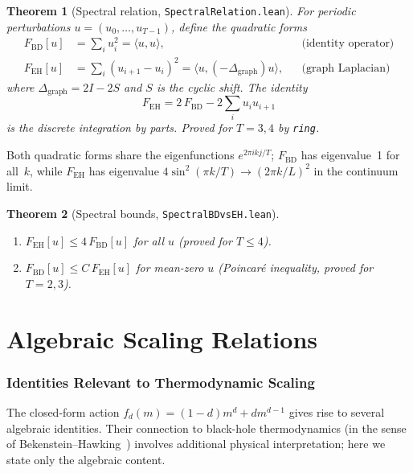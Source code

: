\documentclass[11pt,a4paper]{article}
\newtheorem{theorem}{Theorem}[section]
\theoremstyle{remark}
\begin{document}
\begin{theorem}[Spectral relation, \texttt{SpectralRelation.lean}]
\label{thm:spectral}
For periodic perturbations $u = (u_0, \ldots, u_{T-1})$, define the quadratic forms
\begin{align}
  F_{\mathrm{BD}}[u] &= \sum_i u_i^2 = \langle u, u \rangle,
  &&\text{(identity operator)} \\
  F_{\mathrm{EH}}[u] &= \sum_i (u_{i+1} - u_i)^2 = \langle u, ({-}\Delta_{\mathrm{graph}}) u \rangle,
  &&\text{(graph Laplacian)}
\end{align}
where $\Delta_{\mathrm{graph}} = 2I - 2S$ and $S$ is the cyclic shift.
The identity
\begin{equation}\label{eq:ibp}
  F_{\mathrm{EH}} = 2\,F_{\mathrm{BD}} - 2\sum_i u_i u_{i+1}
\end{equation}
is the discrete integration by parts. Proved for $T = 3, 4$ by \texttt{ring}.
\end{theorem}

Both quadratic forms share the eigenfunctions $e^{2\pi i k j / T}$;
$F_{\mathrm{BD}}$ has eigenvalue~1 for all~$k$, while $F_{\mathrm{EH}}$ has
eigenvalue $4\sin^2(\pi k/T) \to (2\pi k/L)^2$ in the continuum limit.

\begin{theorem}[Spectral bounds, \texttt{SpectralBDvsEH.lean}]
\label{thm:bounds}
\begin{enumerate}
\item $F_{\mathrm{EH}}[u] \leq 4\,F_{\mathrm{BD}}[u]$ for all $u$ (proved for $T \leq 4$).
\item $F_{\mathrm{BD}}[u] \leq C\,F_{\mathrm{EH}}[u]$ for mean-zero $u$ (Poincar\'e inequality,
  proved for $T = 2, 3$).
\end{enumerate}
\end{theorem}

\part{Algebraic Scaling Relations}

\section{Identities Relevant to Thermodynamic Scaling}\label{sec:thermo}

The closed-form action $f_d(m) = (1{-}d)m^d + dm^{d-1}$ gives rise to several
algebraic identities. Their connection to black-hole thermodynamics (in the sense
of Bekenstein--Hawking~\cite{Bekenstein1973,Hawking1975}) involves additional
physical interpretation; here we state only the algebraic content.
\end{document}
